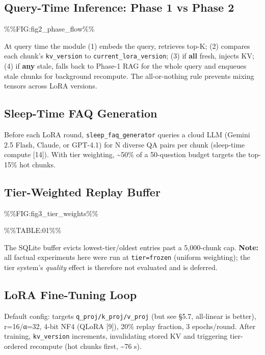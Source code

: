 \hypertarget{query-time-inference-phase-1-vs-phase-2}{%
\subsection{Query-Time Inference: Phase 1 vs Phase 2}\label{query-time-inference-phase-1-vs-phase-2}}

\%\%FIG:fig2\_phase\_flow\%\%

At query time the module (1) embeds the query, retrieves top-K; (2) compares each chunk's \texttt{kv\_version} to \texttt{current\_lora\_version}; (3) if \textbf{all} fresh, injects KV; (4) if \textbf{any} stale, falls back to Phase-1 RAG for the whole query and enqueues stale chunks for background recompute. The all-or-nothing rule prevents mixing tensors across LoRA versions.

\hypertarget{sleep-time-faq-generation}{%
\subsection{Sleep-Time FAQ Generation}\label{sleep-time-faq-generation}}

Before each LoRA round, \texttt{sleep\_faq\_generator} queries a cloud LLM (Gemini 2.5 Flash, Claude, or GPT-4.1) for N diverse QA pairs per chunk (sleep-time compute {[}14{]}). With tier weighting, \textasciitilde50\% of a 50-question budget targets the top-15\% hot chunks.

\hypertarget{tier-weighted-replay-buffer}{%
\subsection{Tier-Weighted Replay Buffer}\label{tier-weighted-replay-buffer}}

\%\%FIG:fig3\_tier\_weights\%\%

\%\%TABLE:01\%\%

The SQLite buffer evicts lowest-tier/oldest entries past a 5,000-chunk cap. \textbf{Note:} all factual experiments here were run at \texttt{tier=frozen} (uniform weighting); the tier system's \emph{quality} effect is therefore not evaluated and is deferred.

\hypertarget{lora-fine-tuning-loop}{%
\subsection{LoRA Fine-Tuning Loop}\label{lora-fine-tuning-loop}}

Default config: targets \texttt{q\_proj/k\_proj/v\_proj} (but see §5.7, all-linear is better), r=16/α=32, 4-bit NF4 (QLoRA {[}9{]}), 20\% replay fraction, 3 epochs/round. After training, \texttt{kv\_version} increments, invalidating stored KV and triggering tier-ordered recompute (hot chunks first, \textasciitilde76 s).

